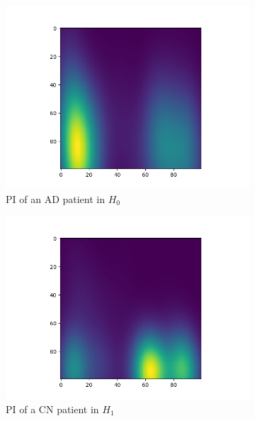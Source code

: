 \documentclass{article}
\begin{document}
\begin{figure}
\begin{subfigure}{0.3\textwidth}
    \includegraphics[width=\textwidth]{figures/PIs/Persistence_image_AD_h_0.png}
    \caption{PI of an AD patient in $H_0$}
  \end{subfigure}
  \begin{subfigure}{0.3\textwidth}
    \includegraphics[width=\textwidth]{figures/PIs/Persistence_image_CN_h_1.png}
    \caption{PI of a CN patient in $H_1$}
  \end{subfigure}
  \begin{subfigure}{0.3\textwidth}

\end{subfigure}
\end{figure}
\end{document}
